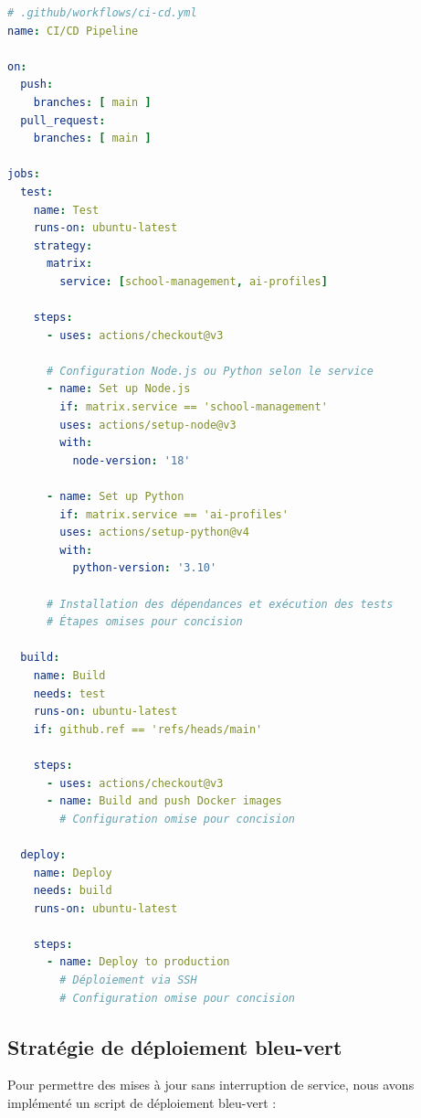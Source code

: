 \begin{lstlisting}[style=codestyle, language=YAML]
# .github/workflows/ci-cd.yml
name: CI/CD Pipeline

on:
  push:
    branches: [ main ]
  pull_request:
    branches: [ main ]

jobs:
  test:
    name: Test
    runs-on: ubuntu-latest
    strategy:
      matrix:
        service: [school-management, ai-profiles]
    
    steps:
      - uses: actions/checkout@v3
      
      # Configuration Node.js ou Python selon le service
      - name: Set up Node.js
        if: matrix.service == 'school-management'
        uses: actions/setup-node@v3
        with:
          node-version: '18'
      
      - name: Set up Python
        if: matrix.service == 'ai-profiles'
        uses: actions/setup-python@v4
        with:
          python-version: '3.10'
      
      # Installation des dépendances et exécution des tests
      # Étapes omises pour concision

  build:
    name: Build
    needs: test
    runs-on: ubuntu-latest
    if: github.ref == 'refs/heads/main'
    
    steps:
      - uses: actions/checkout@v3
      - name: Build and push Docker images
        # Configuration omise pour concision

  deploy:
    name: Deploy
    needs: build
    runs-on: ubuntu-latest
    
    steps:
      - name: Deploy to production
        # Déploiement via SSH
        # Configuration omise pour concision
\end{lstlisting}

\subsection{Stratégie de déploiement bleu-vert}

Pour permettre des mises à jour sans interruption de service, nous avons implémenté un script de déploiement bleu-vert :


